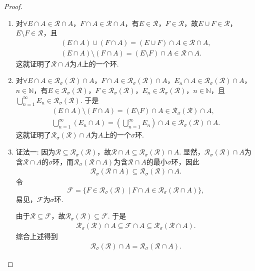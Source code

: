 \documentclass[../../main.tex]{subfiles}%
\begin{document}
\begin{proof}
\begin{enumerate}[(1)]
\item 对$\forall E\cap A\in\mathscr{R}\cap A$，$F\cap A\in\mathscr{R}\cap A$，有$E\in\mathscr{R}$，$F\in\mathscr{R}$，故$E\cup F\in\mathscr{R}$，$E\setminus F\in\mathscr{R}$，且
\begin{align*}
(E\cap A)\cup(F\cap A)=(E\cup F)\cap A\in\mathscr{R}\cap A, \\
(E\cap A)\setminus(F\cap A)=(E\setminus F)\cap A\in\mathscr{R}\cap A.
\end{align*}
这就证明了$\mathscr{R}\cap A$为$A$上的一个环.

\item 对$\forall E\cap A\in\mathscr{R}_\sigma(\mathscr{R})\cap A$，$F\cap A\in\mathscr{R}_\sigma(\mathscr{R})\cap A$，$E_n\cap A\in\mathscr{R}_\sigma(\mathscr{R})\cap A$，$n\in\mathbb{N}$，有$E\in\mathscr{R}_\sigma(\mathscr{R})$，$F\in\mathscr{R}_\sigma(\mathscr{R})$，$E_n\in\mathscr{R}_\sigma(\mathscr{R})$，$n\in\mathbb{N}$，且$\bigcup_{n=1}^{\infty}E_n\in\mathscr{R}_\sigma(\mathscr{R})$. 于是
\begin{align*}
(E\cap A)\setminus(F\cap A)=(E\setminus F)\cap A\in\mathscr{R}_\sigma(\mathscr{R})\cap A, \\
\bigcup_{n=1}^{\infty}(E_n\cap A)=\left(\bigcup_{n=1}^{\infty}E_n\right)\cap A\in\mathscr{R}_\sigma(\mathscr{R})\cap A.
\end{align*}
这就证明了$\mathscr{R}_\sigma(\mathscr{R})\cap A$为$A$上的一个$\sigma$环.

\item {\color{blue}证法一:} 因为$\mathscr{R}\subseteq\mathscr{R}_\sigma(\mathscr{R})$，故$\mathscr{R}\cap A\subseteq\mathscr{R}_\sigma(\mathscr{R})\cap A$. 显然，$\mathscr{R}_\sigma(\mathscr{R})\cap A$为含$\mathscr{R}\cap A$的$\sigma$环，而$\mathscr{R}_\sigma(\mathscr{R}\cap A)$为含$\mathscr{R}\cap A$的最小$\sigma$环，因此
\begin{align*}
\mathscr{R}_\sigma(\mathscr{R}\cap A)\subseteq\mathscr{R}_\sigma(\mathscr{R})\cap A.
\end{align*}
令
\[
\mathscr{F}=\{F\in\mathscr{R}_\sigma(\mathscr{R})\mid F\cap A\in\mathscr{R}_\sigma(\mathscr{R}\cap A)\},
\]
易见，$\mathscr{F}$为$\sigma$环.

由于$\mathscr{R}\subseteq\mathscr{F}$，故$\mathscr{R}_\sigma(\mathscr{R})\subseteq\mathscr{F}$. 于是
\begin{align*}
\mathscr{R}_\sigma(\mathscr{R})\cap A\subseteq\mathscr{F}\cap A\subseteq\mathscr{R}_\sigma(\mathscr{R}\cap A).
\end{align*}
综合上述得到
\begin{align*}
\mathscr{R}_\sigma(\mathscr{R})\cap A=\mathscr{R}_\sigma(\mathscr{R}\cap A).
\end{align*}


\end{enumerate}
\end{proof}
\end{document}
